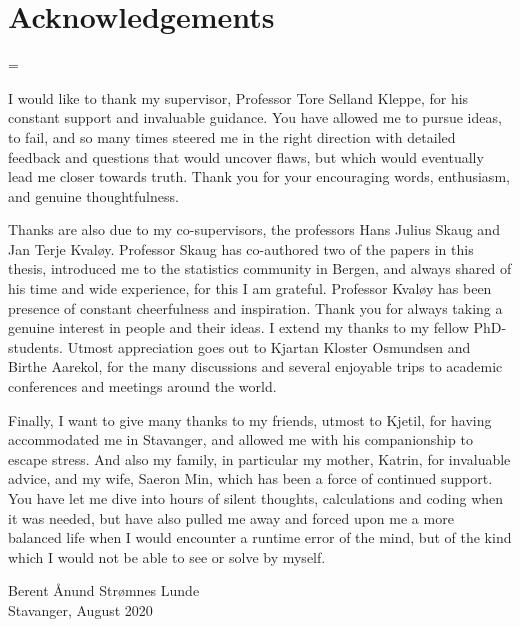 \chapter*{Acknowledgements}

\emergencystretch=\maxdimen
{}

I would like to thank my supervisor, Professor Tore Selland Kleppe, for his constant support and invaluable guidance. You have allowed me to 
pursue ideas, to fail, and so many times steered me in the right direction with detailed feedback and questions that would uncover flaws, but which would eventually lead me closer towards truth.
Thank you for your encouraging words, enthusiasm, and genuine thoughtfulness.

Thanks are also due to my co-supervisors, the professors Hans Julius Skaug and Jan Terje Kvaløy.
Professor Skaug has co-authored two of the papers in this thesis, introduced me to the statistics community in Bergen, and always shared of his time and wide experience, for this I am grateful.
Professor Kvaløy has been presence of constant cheerfulness and inspiration. Thank you for always taking a genuine interest in people and their ideas.
I extend my thanks to my fellow PhD-students. Utmost appreciation goes out to Kjartan Kloster Osmundsen and Birthe Aarekol, for the many discussions and several enjoyable trips to academic conferences and meetings around the world.


Finally, I want to give many thanks to my friends, utmost to Kjetil, for having accommodated me in Stavanger, and allowed me with his companionship to escape stress. And also my family, in particular my mother, Katrin, for invaluable advice, and my wife, Saeron Min, which has been a force of continued support. 
You have let me dive into hours of silent thoughts, calculations and coding when it was needed, but have also pulled me away and forced upon me a more balanced life when I would encounter a runtime error of the mind, but of the kind which I would not be able to see or solve by myself.
\vspace{60pt}

Berent Ånund Strømnes Lunde\\
Stavanger, August 2020